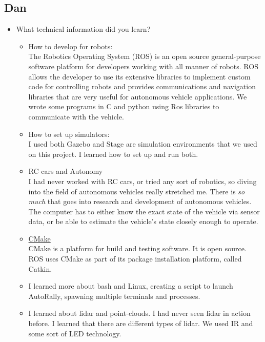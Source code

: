 \documentclass[compsoc,draftclsnofoot,onecolumn,10pt]{IEEEtran}
\begin{document}
\subsection{Dan}
\begin{itemize}

    \item What technical information did you learn?
    \begin{itemize}
        \item How to develop for robots:\\
        The Robotics Operating System (ROS) is an open source general-purpose software
        platform for developers working with all manner of robots. ROS allows the developer to 
        use its extensive libraries to implement custom code for controlling robots and provides communications and navigation libraries that are very useful for autonomous vehicle applications. We wrote some programs in C and python using Ros libraries to communicate with the vehicle.
        \item How to set up simulators:\\
        I used both Gazebo and Stage are simulation environments that we used on this project. I learned how to set up and run both.
        \item RC cars and Autonomy\\
        I had never worked with RC cars, or tried any sort of robotics, so diving into the field of autonomous vehicles really stretched me. There is \textit{so much} that goes into research and development of autonomous vehicles. The computer has to either know the exact state of the vehicle via sensor data, or be able to estimate the vehicle's state closely enough to operate.
        \item \href{https:\\cmake.org}{CMake}\\
        CMake is a platform for build and testing software. It is open source. ROS uses CMake as part of its package installation platform, called Catkin.        
        \item I learned more about bash and Linux, creating a script to launch AutoRally, spawning multiple terminals and processes.
        \item I learned about lidar and point-clouds. I had never seen lidar in action before. I learned that there are different types of lidar. We used IR and some sort of LED technology.
    \end{itemize}
    

\end{itemize}
\end{document}
